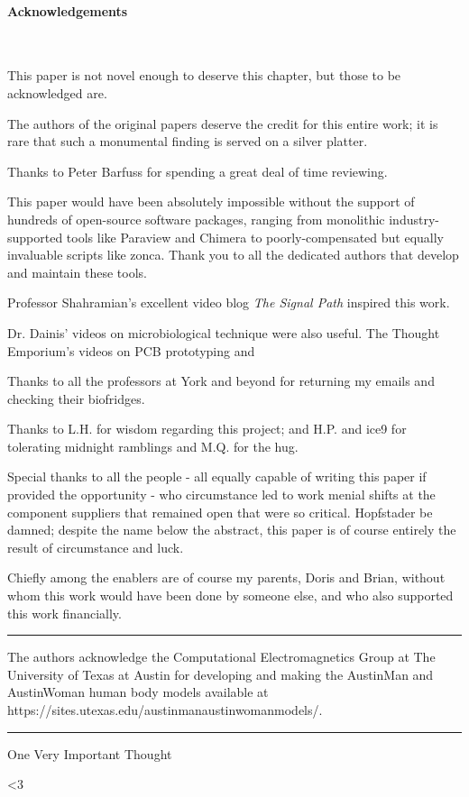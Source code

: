 
\clearpage
\paragraph{Acknowledgements}\

This paper is not novel enough to deserve this chapter, but those to be acknowledged are.

The authors of the original papers deserve the credit for this entire work;  it is rare that such a monumental finding is served on a silver platter.

Thanks to Peter Barfuss for spending a great deal of time reviewing.

This paper would have been absolutely impossible without the support of hundreds of open-source software packages, ranging from monolithic industry-supported tools like Paraview and Chimera to poorly-compensated but equally invaluable scripts like zonca. Thank you to all the dedicated authors that develop and maintain these tools.

Professor Shahramian's excellent video blog {\it The Signal Path} inspired this work. 

Dr. Dainis' videos on microbiological technique were also useful. The Thought Emporium's videos on PCB prototyping and 

Thanks to all the professors at York and beyond for returning my emails and checking their biofridges.

Thanks to L.H. for wisdom regarding this project; and H.P. and ice9 for tolerating midnight ramblings and M.Q. for the hug.

Special thanks to all the people - all equally capable of writing this paper if provided the opportunity - who circumstance led to work menial shifts at the component suppliers that remained open that were so critical. Hopfstader be damned; despite the name below the abstract, this paper is of course entirely the result of circumstance and luck. 

Chiefly among the enablers are of course my parents, Doris and Brian, without whom this work would have been done by someone else, and who also supported this work financially. 


\rule{\linewidth}{0.2pt}

The authors acknowledge the Computational Electromagnetics Group at The University of Texas at Austin for developing and making the AustinMan and AustinWoman human body models available at https://sites.utexas.edu/austinmanaustinwomanmodels/.

\rule{\linewidth}{0.2pt}

One Very Important Thought



{\Large <3}

